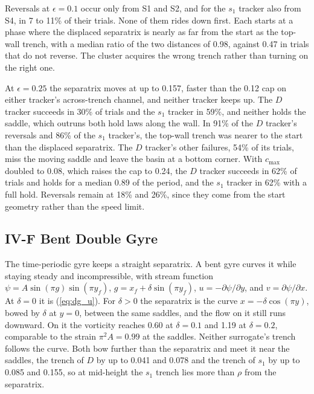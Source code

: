 \documentclass[11pt]{article}
\begin{document}
Reversals at $\epsilon = 0.1$ occur only from S1 and S2, and for the
$s_1$ tracker also from S4, in 7 to 11\% of their trials. None of them
rides down first. Each starts at a phase where the displaced separatrix
is nearly as far from the start as the top-wall trench, with a median
ratio of the two distances of 0.98, against 0.47 in trials that do not
reverse. The cluster acquires the wrong trench rather than turning on the
right one.

At $\epsilon = 0.25$ the separatrix moves at up to 0.157, faster than the
0.12 cap on either tracker's across-trench channel, and neither tracker
keeps up. The $D$ tracker succeeds in 30\% of trials and the $s_1$
tracker in 59\%, and neither holds the saddle, which outruns both hold
laws along the wall. In 91\% of the $D$ tracker's reversals and 86\% of
the $s_1$ tracker's, the top-wall trench was nearer to the start than the
displaced separatrix. The $D$ tracker's other failures, 54\% of its
trials, miss the moving saddle and leave the basin at a bottom corner.
With $c_{\max}$ doubled to 0.08, which raises the cap to 0.24, the $D$
tracker succeeds in 62\% of trials and holds for a median 0.89 of the
period, and the $s_1$ tracker in 62\% with a full hold. Reversals remain at
18\% and 26\%, since they come from the start geometry rather than the
speed limit.

\subsection*{IV-F \quad Bent Double Gyre}

The time-periodic gyre keeps a straight separatrix. A bent gyre curves it
while staying steady and incompressible, with stream function
$\psi = A\sin(\pi g)\sin(\pi y_f)$, $g = x_f + \delta\sin(\pi y_f)$,
$u = -\partial\psi/\partial y$, and $v = \partial\psi/\partial x$. At
$\delta = 0$ it is (\ref{eq:dg_u}). For $\delta > 0$ the separatrix is the
curve $x = -\delta\cos(\pi y)$, bowed by $\delta$ at $y = 0$, between the
same saddles, and the flow on it still runs downward. On it the vorticity
reaches 0.60 at $\delta = 0.1$ and 1.19 at $\delta = 0.2$, comparable to
the strain $\pi^2 A = 0.99$ at the saddles. Neither surrogate's trench
follows the curve. Both bow further than the separatrix and meet it near
the saddles, the trench of $D$ by up to 0.041 and 0.078 and the trench of
$s_1$ by up to 0.085 and 0.155, so at mid-height the $s_1$ trench lies
more than $\rho$ from the separatrix.
\end{document}
